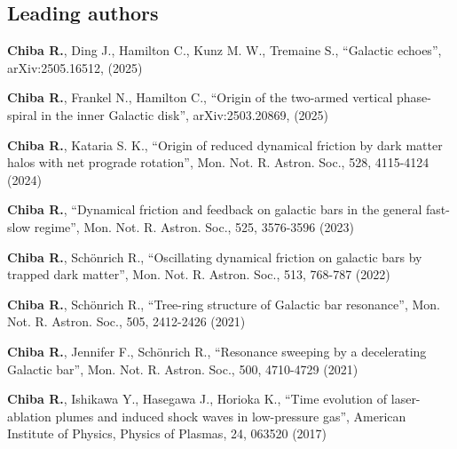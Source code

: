 \documentclass[]{res}
\begin{document}
\begin{resume}
\subsection{Leading authors}
\begin{etaremune}[leftmargin=6mm,rightmargin=-6mm]
    \item \textbf{Chiba R.}, Ding J., Hamilton C., Kunz M. W., Tremaine S., ``Galactic echoes'', \\
    arXiv:2505.16512, (2025)
    \item \textbf{Chiba R.}, Frankel N., Hamilton C., ``Origin of the two-armed vertical phase-spiral in the inner Galactic disk'', arXiv:2503.20869, (2025)
    \item \textbf{Chiba R.}, Kataria S. K., ``Origin of reduced dynamical friction by dark matter halos with net prograde rotation'', Mon. Not. R. Astron. Soc., 528, 4115-4124 (2024)
    \item \textbf{Chiba R.}, ``Dynamical friction and feedback on galactic bars in the general fast-slow regime'', Mon. Not. R. Astron. Soc., 525, 3576-3596 (2023)
    \item \textbf{Chiba R.}, Schönrich R., ``Oscillating dynamical friction on galactic bars by trapped dark matter'', Mon. Not. R. Astron. Soc., 513, 768-787 (2022)
    \item \textbf{Chiba R.}, Schönrich R., ``Tree-ring structure of Galactic bar resonance'', Mon. Not. R. Astron. Soc., 505, 2412-2426 (2021)
    \item \textbf{Chiba R.}, Jennifer F., Schönrich R., ``Resonance sweeping by a decelerating Galactic bar'', Mon. Not. R. Astron. Soc., 500, 4710-4729 (2021)
    \item \textbf{Chiba R.}, Ishikawa Y., Hasegawa J., Horioka K., ``Time evolution of laser-ablation plumes and induced shock waves in low-pressure gas'', American Institute of Physics, Physics of Plasmas, 24, 063520 (2017)
\end{etaremune}
\noindent

\end{resume}
\end{document}
